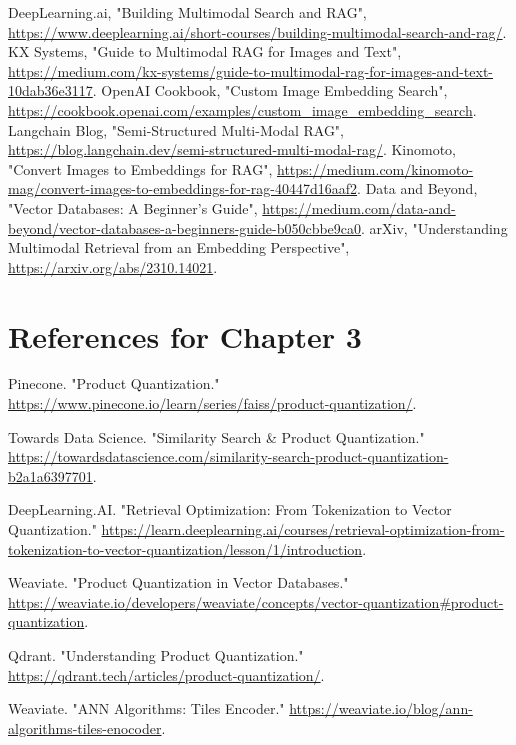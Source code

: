 \documentclass[12pt,a4paper,twoside,openright,justified]{book}
\begin{document}
\begin{thebibliography}{99}
     DeepLearning.ai, "Building Multimodal Search and RAG", \url{https://www.deeplearning.ai/short-courses/building-multimodal-search-and-rag/}.
     KX Systems, "Guide to Multimodal RAG for Images and Text", \url{https://medium.com/kx-systems/guide-to-multimodal-rag-for-images-and-text-10dab36e3117}.
     OpenAI Cookbook, "Custom Image Embedding Search", \url{https://cookbook.openai.com/examples/custom_image_embedding_search}.
     Langchain Blog, "Semi-Structured Multi-Modal RAG", \url{https://blog.langchain.dev/semi-structured-multi-modal-rag/}.
     Kinomoto, "Convert Images to Embeddings for RAG", \url{https://medium.com/kinomoto-mag/convert-images-to-embeddings-for-rag-40447d16aaf2}.
     Data and Beyond, "Vector Databases: A Beginner's Guide", \url{https://medium.com/data-and-beyond/vector-databases-a-beginners-guide-b050cbbe9ca0}.
     arXiv, "Understanding Multimodal Retrieval from an Embedding Perspective", \url{https://arxiv.org/abs/2310.14021}.




\section*{References for Chapter 3}

Pinecone. "Product Quantization."  
\url{https://www.pinecone.io/learn/series/faiss/product-quantization/}.

Towards Data Science. "Similarity Search & Product Quantization."  
\url{https://towardsdatascience.com/similarity-search-product-quantization-b2a1a6397701}.

DeepLearning.AI. "Retrieval Optimization: From Tokenization to Vector Quantization."  
\url{https://learn.deeplearning.ai/courses/retrieval-optimization-from-tokenization-to-vector-quantization/lesson/1/introduction}.

Weaviate. "Product Quantization in Vector Databases."  
\url{https://weaviate.io/developers/weaviate/concepts/vector-quantization#product-quantization}.

Qdrant. "Understanding Product Quantization."  
\url{https://qdrant.tech/articles/product-quantization/}.

Weaviate. "ANN Algorithms: Tiles Encoder."  
\url{https://weaviate.io/blog/ann-algorithms-tiles-enocoder}.


\end{thebibliography}
\end{document}
